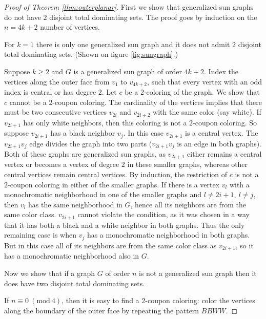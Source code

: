 \begin{proof}[Proof of Theorem \ref{thm:outerplanar}]
  First we show that generalized sun graphs do not have $2$ disjoint total
  dominating sets. The proof goes by induction on the $n = 4k + 2$ number of vertices.

  For $k = 1$ there is only one generalized sun graph and it does not admit $2$
  disjoint total dominating sets. (Shown on figure \ref{fig:sungraph}.)

  Suppose $k \ge 2$ and $G$ is a generalized sun graph of order $4k + 2$. Index
  the vertices along the outer face from $v_1$ to $v_{4k + 2}$, such that every
  vertex with an odd index is central or has degree $2$. Let $c$ be a $2$-coloring of
  the graph. We show that $c$ cannot be a $2$-coupon coloring. The cardinality of the
  vertices implies that there must be two consecutive vertices $v_{2i}$ and $v_{2i + 2}$
  with the same color (say white). If $v_{2i + 1}$ has only white neighbors, then this
  coloring is not a $2$-coupon coloring. So suppose $v_{2i + 1}$ has a black neighbor
  $v_j$. In this case $v_{2i + 1}$ is a central vertex. The $v_{2i + 1}v_j$ edge divides the graph
  into two parts ($v_{2i + 1}v_j$ is an edge in both graphs). Both of
  these graphs are generalized sun graphs, as $v_{2i + 1}$ either remains a central
  vertex or becomes a vertex of degree $2$ in these smaller graphs, whereas other
  central vertices remain central vertices. By induction, the restriction of
  $c$ is not a $2$-coupon coloring in either of the smaller graphs. If there is
  a vertex $v_l$ with a monochromatic neighborhood in one of the smaller graphs
  and $l \neq 2i + 1,\ l \neq j$, then $v_l$ has the same neighborhood in $G$, hence
  all its neighbors are from the same color class. $v_{2i + 1}$ cannot violate the
  condition, as it was chosen in a way that it has both a black and a white neighbor
  in both graphs. Thus the only remaining case is when $v_j$ has a monochromatic
  neighborhood in both graphs. But in this case all of its neighbors are from
  the same color class as $v_{2i + 1}$, so it has a monochromatic neighborhood also
  in $G$.

  \vspace{0.4cm}

  Now we show that if a graph $G$ of order $n$ is not a generalized sun graph
  then it does have two disjoint total dominating sets.

  If $n \equiv 0\ (\textrm{mod}\ 4)$, then it is easy to find a $2$-coupon coloring:
  color the vertices along the boundary of the outer face by repeating the pattern
  $BBWW$.


\end{proof}
